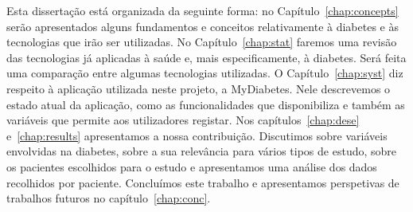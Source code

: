Esta dissertação está organizada da seguinte forma: no Capítulo~\ref{chap:concepts} serão apresentados alguns fundamentos e conceitos relativamente à diabetes e às tecnologias que irão ser utilizadas.
No Capítulo~\ref{chap:stat} faremos uma revisão das tecnologias já aplicadas à saúde e, mais especificamente, à diabetes. Será feita uma comparação entre algumas tecnologias utilizadas.
O Capítulo~\ref{chap:syst} diz respeito à aplicação utilizada neste projeto, a MyDiabetes. Nele descrevemos o estado atual da aplicação, como as funcionalidades que disponibiliza e também as variáveis que permite aos utilizadores registar.
Nos capítulos~\ref{chap:dese} e~\ref{chap:results} apresentamos a nossa contribuição. Discutimos sobre variáveis envolvidas na diabetes, sobre a sua relevância para vários tipos de estudo, sobre os pacientes escolhidos para o estudo e apresentamos uma análise dos dados recolhidos por paciente. Concluímos este trabalho e apresentamos perspetivas de trabalhos futuros no capítulo~\ref{chap:conc}.





